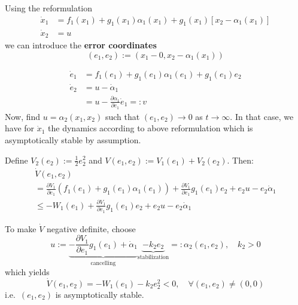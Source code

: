 Using the reformulation
\begin{align*}
    \dot{x}_1 & = f_1(x_1) + g_1(x_1)\alpha_1(x_1) + g_1(x_1)[x_2 - \alpha_1(x_1)] \\
    \dot{x}_2 & = u
\end{align*}
we can introduce the \textbf{error coordinates}
\begin{equation*}
    (e_1, e_2) := (x_1 - 0, x_2 - \alpha_1(x_1))
\end{equation*}

\newpar{}

\begin{align*}
    \dot{e}_1 & = f_1(e_1) + g_1(e_1)\alpha_1(e_1) + g_1(e_1)e_2            \\
    \dot{e}_2 & = u - \dot{\alpha}_1                                        \\
              & = u - \frac{\partial \alpha_1}{\partial e_1} \dot{e}_1 =: v
\end{align*}
Now, find $u = \alpha_2(x_1, x_2)$ such that $(e_1, e_2) \to 0$ as $t \to \infty$. In that case, we have for $\dot{x}_1$ the dynamics according to above reformulation which is asymptotically stable by assumption.

\newpar{}

Define $V_2(e_2) := \frac{1}{2}e_2^2$ and $V(e_1, e_2) := V_1(e_1) + V_2(e_2)$. Then:
{\small
\begin{gather*}
    \dot{V}(e_1, e_2) \\
    = \frac{\partial V_1}{\partial e_1}(f_1(e_1) + g_1(e_1)\alpha_1(e_1)) + \frac{\partial V_1}{\partial e_1}g_1(e_1)e_2 + e_2u - e_2\dot{\alpha}_1\\
    \leq -W_1(e_1) + \frac{\partial V_1}{\partial e_1}g_1(e_1)e_2 + e_2u - e_2\dot{\alpha}_1
\end{gather*}
}
\newpar{}
\label{backstepping_input}

To make $\dot{V}$ negative definite, choose
\begin{equation*}
    u := \underbrace{-\frac{\partial V_1}{\partial e_1}g_1(e_1) + \dot{\alpha}_1}_{\text{cancelling}} \underbrace{- k_2e_2}_{\text{stabilization}} =: \alpha_2(e_1, e_2), \quad k_2 > 0
\end{equation*}
which yields
\begin{equation*}
    \dot{V}(e_1, e_2) = -W_1(e_1) - k_2 e_2^2 < 0, \quad \forall (e_1, e_2) \neq (0, 0)
\end{equation*}
i.e.\ $(e_1, e_2)$ is asymptotically stable.
\newpar{}

